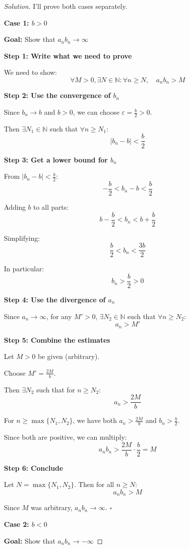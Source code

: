 \documentclass[12pt,a4paper]{article}
\theoremstyle{definition}
\theoremstyle{remark}
\newenvironment{solution}{\begin{proof}[Solution]}{\end{proof}}
\begin{document}
\begin{solution}
I'll prove both cases separately.

\textbf{Case 1: $b > 0$}

\textbf{Goal:} Show that $a_n b_n \to \infty$

\textbf{Step 1: Write what we need to prove}

We need to show:
\[
\forall M > 0, \exists N \in \mathbb{N} : \forall n \geq N, \quad a_n b_n > M
\]

\textbf{Step 2: Use the convergence of $b_n$}

Since $b_n \to b$ and $b > 0$, we can choose $\varepsilon = \frac{b}{2} > 0$.

Then $\exists N_1 \in \mathbb{N}$ such that $\forall n \geq N_1$:
\[
|b_n - b| < \frac{b}{2}
\]

\textbf{Step 3: Get a lower bound for $b_n$}

From $|b_n - b| < \frac{b}{2}$:
\[
-\frac{b}{2} < b_n - b < \frac{b}{2}
\]

Adding $b$ to all parts:
\[
b - \frac{b}{2} < b_n < b + \frac{b}{2}
\]

Simplifying:
\[
\frac{b}{2} < b_n < \frac{3b}{2}
\]

In particular:
\[
b_n > \frac{b}{2} > 0
\]

\textbf{Step 4: Use the divergence of $a_n$}

Since $a_n \to \infty$, for any $M' > 0$, $\exists N_2 \in \mathbb{N}$ such that $\forall n \geq N_2$:
\[
a_n > M'
\]

\textbf{Step 5: Combine the estimates}

Let $M > 0$ be given (arbitrary).

Choose $M' = \frac{2M}{b}$.

Then $\exists N_2$ such that for $n \geq N_2$:
\[
a_n > \frac{2M}{b}
\]

For $n \geq \max\{N_1, N_2\}$, we have both $a_n > \frac{2M}{b}$ and $b_n > \frac{b}{2}$.

Since both are positive, we can multiply:
\[
a_n b_n > \frac{2M}{b} \cdot \frac{b}{2} = M
\]

\textbf{Step 6: Conclude}

Let $N = \max\{N_1, N_2\}$. Then for all $n \geq N$:
\[
a_n b_n > M
\]

Since $M$ was arbitrary, $a_n b_n \to \infty$. $\square$

\bigskip

\textbf{Case 2: $b < 0$}

\textbf{Goal:} Show that $a_n b_n \to -\infty$


\end{solution}
\end{document}
